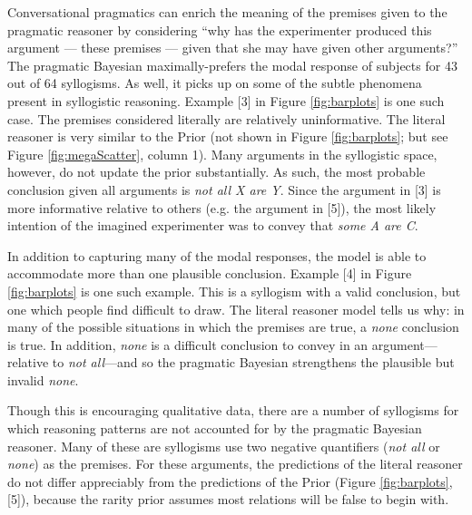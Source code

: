 \documentclass[10pt,letterpaper]{article}
\begin{document}
%


Conversational pragmatics can enrich the meaning of the premises given to the pragmatic reasoner by considering ``why has the experimenter produced this argument --- these premises --- given that she may have given other arguments?'' 
The pragmatic Bayesian maximally-prefers the modal response of subjects for 43 out of 64 syllogisms. As well, it picks up on some of the subtle phenomena present in syllogistic reasoning. Example [3] in Figure \ref{fig:barplots} is one such case. The premises considered literally are relatively uninformative. The literal reasoner is very similar to the Prior (not shown in Figure \ref{fig:barplots}; but see Figure \ref{fig:megaScatter}, column 1). Many arguments in the syllogistic space, however, do not update the prior substantially. As such, the most probable conclusion given all arguments is  \emph{not all X are Y}. Since the argument in [3] is more informative relative to others (e.g. the argument in [5]), the most likely intention of the imagined experimenter was to convey that \emph{some A are C}.

In addition to capturing many of the modal responses, the model is able to accommodate more than one plausible conclusion. Example [4] in Figure \ref{fig:barplots} is one such example. This is a syllogism with a valid conclusion, but one which people find difficult to draw. The literal reasoner model tells us why: in many of the possible situations in which the premises are true, a \emph{none} conclusion is true. In addition, \emph{none} is a difficult conclusion to convey in an argument---relative to \emph{not all}---and so the pragmatic Bayesian strengthens the plausible but invalid \emph{none}.

Though this is encouraging qualitative data, there are a number of syllogisms for which reasoning patterns are not accounted for by the pragmatic Bayesian reasoner. Many of these are syllogisms use two negative quantifiers (\emph{not all} or \emph{none}) as the premises. For these arguments, the predictions of the literal reasoner do not differ appreciably from the predictions of the Prior (Figure \ref{fig:barplots}, [5]), because the rarity prior assumes most relations will be false to begin with. 
\end{document}
